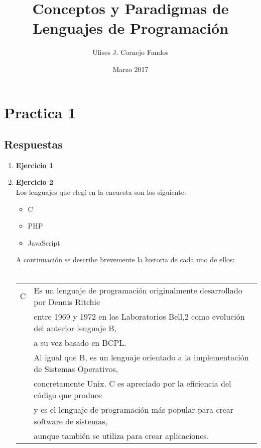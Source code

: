 \documentclass[a4paper,10pt]{article}
\title{Conceptos y Paradigmas de Lenguajes de Programación}
\author{Ulises J. Cornejo Fandos}
\date{Marzo 2017}
\begin{document}
\maketitle

\section{Practica 1}
\subsection{Respuestas}
    \begin{enumerate}
        \item \textbf{Ejercicio 1}
        \item \textbf{Ejercicio 2} \\
        Los lenguajes que elegí en la encuesta son los siguiente:
        \begin{itemize}
            \item C
            \item PHP
            \item JavaScript
        \end{itemize}
        A continuación se describe brevemente la historia de cada uno de ellos: \\ \\
        \begin{tabular}{r|l}
            \textsc{C} 
                & Es un lenguaje de programación originalmente desarrollado por Dennis Ritchie \\ 
                & entre 1969 y 1972 en los Laboratorios Bell,2 como evolución del anterior lenguaje B, \\
                & a su vez basado en BCPL. \\
                
                & Al igual que B, es un lenguaje orientado a la implementación de Sistemas Operativos, \\
                & concretamente Unix. C es apreciado por la eficiencia del código que produce \\ 
                & y es el lenguaje de programación más popular para crear software de sistemas,\\ 
                & aunque también se utiliza para crear aplicaciones. \\
        

\end{tabular}
\end{enumerate}
\end{document}
